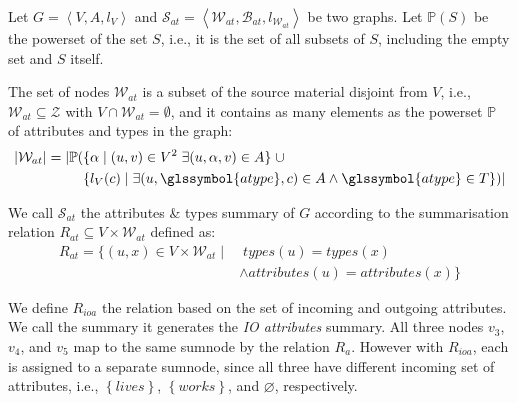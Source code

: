 \begin{definition}
	Let $G=\left\langle V, A, l_V \right\rangle$ and $\mathcal{S}_{at} = \left\langle \mathcal{W}_{at}, \mathcal{B}_{at}, l_{\mathcal{W}_{at}} \right\rangle$ be two graphs. Let $\mathbb{P}(S)$ be the powerset of the set $S$, i.e., it is the set of all subsets of $S$, including the empty set and $S$ itself.

	The set of nodes $\mathcal{W}_{at}$ is a subset of the source material disjoint from $V$, i.e., $\mathcal{W}_{at} \subseteq \mathcal{Z}$ with $V \cap \mathcal{W}_{at} = \emptyset$, and it contains as many elements as the powerset $\mathbb{P}$ of attributes and types in the graph:
	$$
	\begin{aligned}
	\lvert \mathcal{W}_{at} \rvert = \lvert \mathbb{P} ( & \{ \alpha \mid (u, v) \in V^2\; \exists (u, \alpha, v) \in A \} \;\cup \\
	& \{ l_V(c) \mid \exists (u, \glssymbol{atype}, c) \in A \wedge \glssymbol{atype} \in T \} ) \rvert
	\end{aligned}
	$$

	We call $\mathcal{S}_{at}$ the attributes \& types summary of $G$ according to the summarisation relation $R_{at} \subseteq V \times \mathcal{W}_{at}$ defined as:
	$$
	\begin{aligned}
	R_{at} = \{ (u, x) \in V \times \mathcal{W}_{at} \mid &\; types(u) = types(x) \\
	& \wedge attributes(u) = attributes(x) \}
	\end{aligned}
	$$
	\label{def:at}
\end{definition}


We define $R_{ioa}$ the relation based on the set of incoming and outgoing attributes. We call the summary it generates the \emph{IO attributes} summary.
All three nodes $v_3$, $v_4$, and $v_5$ map to the same sumnode by the relation $R_a$. However with $R_{ioa}$, each is assigned to a separate sumnode, since all three have different incoming set of attributes, i.e., $\left\lbrace lives \right\rbrace$, $\left\lbrace works \right\rbrace$, and $\varnothing$, respectively.

